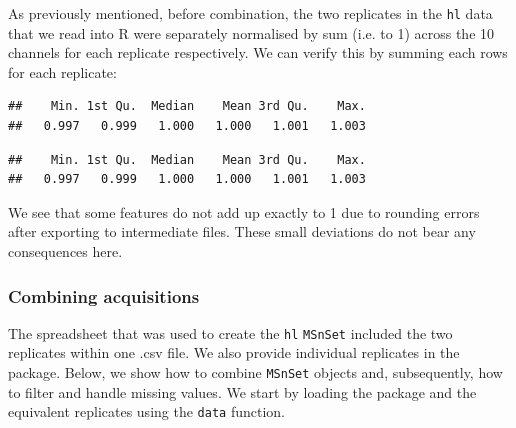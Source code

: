 As previously mentioned, before combination, the two replicates in the
\texttt{hl} data that we read into R were separately normalised by sum (i.e.
to 1) across the 10 channels for each replicate respectively. We can
verify this by summing each rows for each replicate:

\begin{knitrout}
\color{fgcolor}\begin{kframe}
\begin{alltt}
\hlstd{(}\hlstd{(}\hlstd{(hl[, hl}\hlopt{$} \hlopt{==} \hlstd{])))}
\end{alltt}
\begin{verbatim}
##    Min. 1st Qu.  Median    Mean 3rd Qu.    Max. 
##   0.997   0.999   1.000   1.000   1.001   1.003
\end{verbatim}
\begin{alltt}
\hlstd{(}\hlstd{(}\hlstd{(hl[, hl}\hlopt{$} \hlopt{==} \hlstd{])))}
\end{alltt}
\begin{verbatim}
##    Min. 1st Qu.  Median    Mean 3rd Qu.    Max. 
##   0.997   0.999   1.000   1.000   1.001   1.003
\end{verbatim}
\end{kframe}
\end{knitrout}

We see that some features do not add up exactly to 1 due to rounding
errors after exporting to intermediate files. These small deviations
do not bear any consequences here.


\subsubsection*{Combining acquisitions}

The spreadsheet that was used to create the \texttt{hl}
\texttt{MSnSet} included the two replicates within one .csv file.  We
also provide individual replicates in the 
package. Below, we show how to combine \texttt{MSnSet} objects and,
subsequently, how to filter and handle missing values. We start by
loading the  package and the equivalent
replicates using the \texttt{data} function.

\begin{knitrout}
\color{fgcolor}\begin{kframe}
\begin{alltt}
\hlstd{(}\hlstd{)}
\end{alltt}
\end{kframe}
\end{knitrout}

